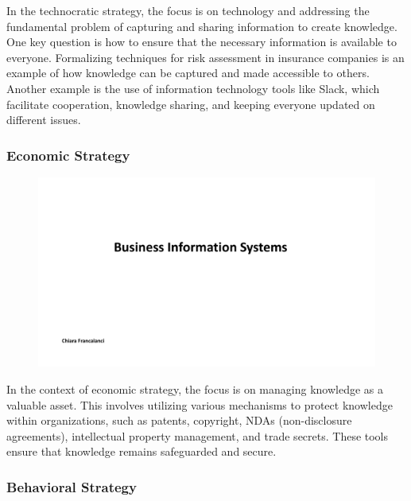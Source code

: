 In the technocratic strategy, the focus is on technology and addressing
the fundamental problem of capturing and sharing information to create
knowledge. One key question is how to ensure that the necessary
information is available to everyone. Formalizing techniques for risk
assessment in insurance companies is an example of how knowledge can be
captured and made accessible to others. Another example is the use of
information technology tools like Slack, which facilitate cooperation,
knowledge sharing, and keeping everyone updated on different issues.

\subsubsection{Economic Strategy}\label{economic-strategy}

\begin{figure}[!h]
  \centering
  \includegraphics[page=11, trim = 1.5cm 2.8cm 1.5cm 4.5cm, clip, width=\imagewidth]{images/05 - KM.pdf}
\end{figure}

In the context of economic strategy, the focus is on managing knowledge
as a valuable asset. This involves utilizing various mechanisms to
protect knowledge within organizations, such as patents, copyright, NDAs
(non-disclosure agreements), intellectual property management, and trade
secrets. These tools ensure that knowledge remains safeguarded and
secure.

\subsubsection{Behavioral Strategy}\label{behavioral-strategy}

